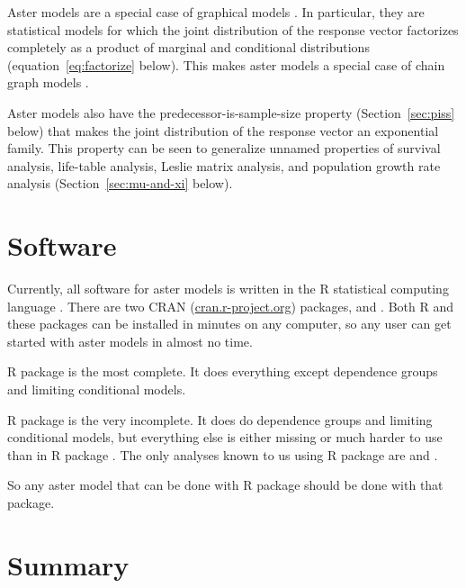 Aster models are a special case of graphical models \citep{lauritzen}.
In particular, they are statistical models for which the joint distribution
of the response vector factorizes completely as a product of marginal and
conditional distributions (equation~\eqref{eq:factorize} below).
This makes aster models a special case of chain graph models
\citep[Sections~2.1.1 and~3.2.3]{lauritzen}.

Aster models also have the predecessor-is-sample-size property
(Section~\ref{sec:piss} below)
that makes the joint distribution of the response vector an exponential
family.  This property can be seen to generalize unnamed properties
of survival analysis, life-table analysis, Leslie matrix analysis,
and population growth rate analysis (Section~\ref{sec:mu-and-xi} below).

\section{Software}
\label{sec:software}

Currently, all software for aster models is written in the R statistical
computing language \citep{r-core}.  There are two CRAN
(\url{cran.r-project.org}) packages,  \citep{aster-package} and
 \citep{aster2-package}.
Both R and these packages can be installed in minutes on any computer,
so any user can get started with aster models in almost no time.

R package  is the most complete.
It does everything except dependence groups
and limiting conditional models.

R package  is the very incomplete.
It does do dependence groups and limiting conditional models, but everything
else is either missing or much harder to use than in R package .
The only analyses known to us using R package  are
\citet{aster-hornworm} and \citet*{aster-microbial-symbionts}.

So any aster model that can be done with R package  should
be done with that package.

\section{Summary}

